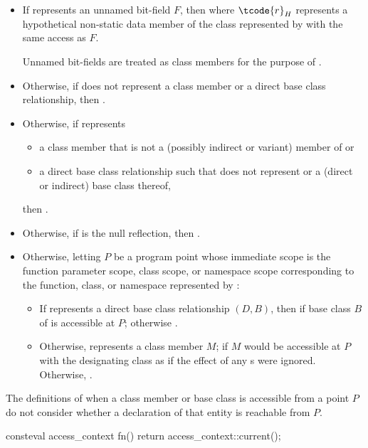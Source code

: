 \begin{itemdescr}
\pnum
\returns
\begin{itemize}
\item
  If  represents an unnamed bit-field $F$,
  then 
  where $\tcode{r}_H$ represents a hypothetical non-static data member
  of the class represented by 
  with the same access as $F$.
  \begin{note}
  Unnamed bit-fields are treated as class members
  for the purpose of .
  \end{note}
\item
  Otherwise, if  does not represent a class member
  or a direct base class relationship,
  then .
\item
  Otherwise, if  represents
  \begin{itemize}
  \item
    a class member that is not a (possibly indirect or variant)
    member of  or
  \item
    a direct base class relationship such that 
    does not represent 
    or a (direct or indirect) base class thereof,
  \end{itemize}
  then .
\item
  Otherwise, if  is the null reflection,
  then .
\item
  Otherwise, letting $P$ be a program point whose immediate scope is the
  function parameter scope, class scope, or namespace scope
  corresponding to the
  function, class, or namespace
  represented by :
  \begin{itemize}
  \item
    If  represents a direct base class relationship $(D, B)$,
    then  if base class $B$ of 
    is accessible at $P$;
    otherwise .
  \item
    Otherwise,  represents a class member $M$;
     if $M$ would be accessible at $P$
    with the designating class as 
    if the effect of any s were ignored.
    Otherwise, .
  \end{itemize}
\end{itemize}
\begin{note}
The definitions of when a class member or base class is accessible from a point $P$
do not consider whether a declaration of that entity is reachable from $P$.
\end{note}
\begin{example}
\begin{codeblock}
consteval access_context fn() {
  return access_context::current();
}


\end{codeblock}
\end{example}
\end{itemdescr}
